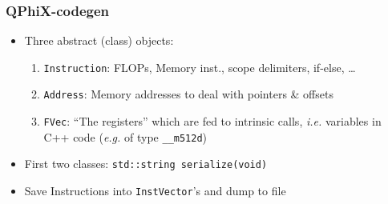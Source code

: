 \documentclass{beamer}
\begin{document}
\begin{frame}
\begin{columns}[T]
\begin{column}{.5\textwidth}
\begin{center}
        \end{center}
      \end{column}
    \end{columns}

  \end{frame}


  \begin{frame}[fragile]
    \frametitle{QPhiX-codegen}

    \begin{itemize}
      \item Three abstract (class) objects:
        \begin{enumerate}
          \item \texttt{Instruction}: FLOPs, Memory inst., scope delimiters, if-else, \dots
          \item \texttt{Address}: Memory addresses to deal with pointers \& offsets
          \item \texttt{FVec}: ``The registers'' which are fed to intrinsic calls, \textit{i.e.}
            variables in C++ code (\textit{e.g.} of type \texttt{\_\_m512d})
        \end{enumerate}
            \vfill

      \item First two classes: \;\; \texttt{std::string serialize(void)}
            \vfill
      \item Save Instructions into \texttt{InstVector}'s and dump to file
    \end{itemize}

    \tiny
\end{frame}

\end{document}
